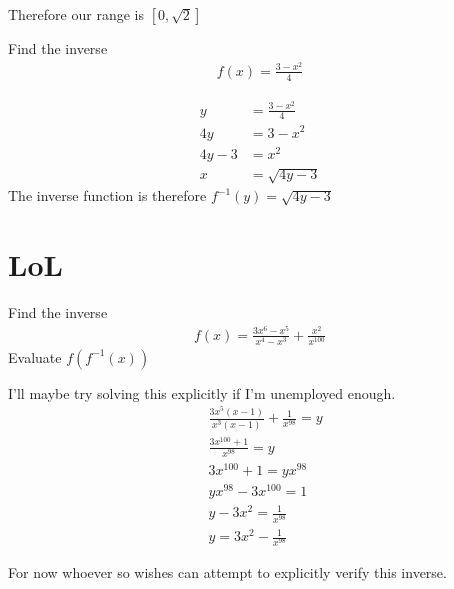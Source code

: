 \documentclass[a4paper]{article}
\begin{document}
Therefore our range is \([0, \sqrt{2}]\)

\begin{question}{}{}
Find the inverse
\begin{align*}
f(x) = \frac{3-x^2}{4}
\end{align*}
\end{question}
\begin{align*}
y &= \frac{3-x^2}{4} \\
4y &= 3 -x^2 \\
4y -3 &= x^2 \\
x &= \sqrt{4y-3}
\end{align*}
The inverse function is therefore \(f^{-1}(y) = \sqrt{4y-3}\)

\section{LoL}
\begin{question}{}{}
Find the inverse
\begin{align*}
f(x) = \frac{3x^6 - x^5}{x^4 -x^3} + \frac{x^2}{x^{100}}
\end{align*}
Evaluate \(f(f^{-1}(x))\)
\end{question}
I'll maybe try solving this explicitly if I'm unemployed enough.
\begin{align*}
&\frac{3x^5(x-1)}{x^3(x-1)} + \frac{1}{x^{98}} = y \\
&\frac{3x^{100} + 1}{x^{98}} = y \\
&3x^{100} + 1 = yx^{98} \\
&yx^{98} -3x^{100} = 1 \\
&y -3x^2 = \frac{1}{x^{98}} \\
&y = 3x^2 -\frac{1}{x^{98}}
\end{align*}

For now whoever so wishes can attempt to explicitly verify this inverse.
\end{document}
